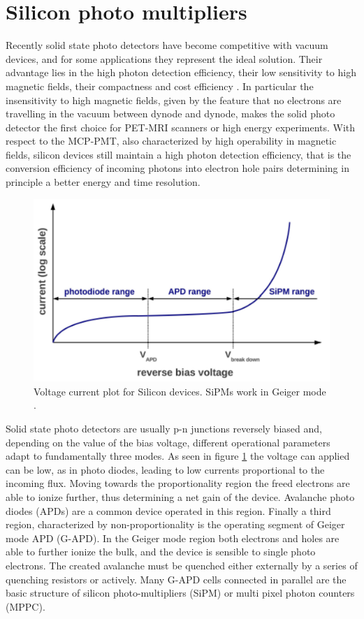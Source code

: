 \section{Silicon photo multipliers}
Recently solid state photo detectors have become competitive with vacuum devices, and for some applications they represent the ideal solution. Their advantage lies in the high photon detection efficiency, their low sensitivity to high magnetic fields, their compactness and cost efficiency \cite{Dolgoshein2003}.
In particular the insensitivity to high magnetic fields, given by the feature that no electrons are travelling in the vacuum between dynode and dynode, makes the solid photo detector the first choice for PET-MRI scanners or high energy experiments. With respect to the MCP-PMT, also characterized by high operability in magnetic fields, silicon devices still maintain a high photon detection efficiency, that is the conversion efficiency of incoming photons into electron hole pairs determining in principle a better energy and time resolution.
\begin{figure}[htbp]
\begin{center}
\includegraphics[width=12cm]{../Pictures/Chapter_3/avalanche.pdf}
\end{center}
\caption[I-V plot Silicon detectors]{Voltage current plot for Silicon devices. SiPMs work in Geiger mode \cite{Gundacker2014}.}
\label{fig:avalanche}
\end{figure}

Solid state photo detectors are usually p-n junctions reversely biased and, depending on the value of the bias voltage, different operational parameters adapt to fundamentally three modes.
As seen in figure \ref{fig:avalanche} the voltage can applied can be low, as in photo diodes, leading to low currents proportional to the incoming flux. Moving towards the proportionality region the freed electrons are able to ionize further, thus determining a net gain of the device. Avalanche photo diodes (APDs) are a common device operated in this region.
Finally a third region, characterized by non-proportionality is the operating segment of Geiger mode APD (G-APD). In the Geiger mode region both electrons and holes are able to further ionize the bulk, and the device is sensible to single photo electrons. The created avalanche must be quenched either externally by a series of quenching resistors or actively.
Many G-APD cells connected in parallel are the basic structure of silicon photo-multipliers (SiPM) or multi pixel photon counters (MPPC).

